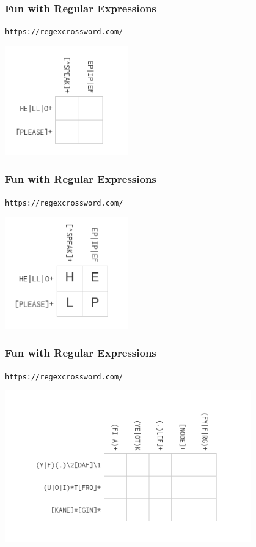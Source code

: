 \documentclass{beamer}
\begin{document}
\begin{frame}[fragile]
\frametitle{Fun with Regular Expressions}
\texttt{https://regexcrossword.com/}
\begin{center}
\includegraphics[width=0.4\textwidth]{pics/regex/crossword1.png}
\end{center}
\end{frame}

\begin{frame}[fragile]
\frametitle{Fun with Regular Expressions}
\texttt{https://regexcrossword.com/}
\begin{center}
\includegraphics[width=0.4\textwidth]{pics/regex/crossword2.png}
\end{center}
\end{frame}

\begin{frame}[fragile]
\frametitle{Fun with Regular Expressions}
\texttt{https://regexcrossword.com/}
\begin{center}
\includegraphics[width=0.8\textwidth]{pics/crosswords}
\end{center}
\end{frame}
\end{document}
